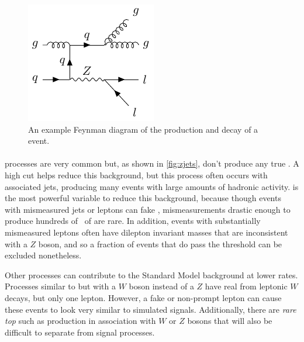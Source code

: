 \begin{centering}
\begin{figure}[bth]
\myfloatalign
\includegraphics[width=.70\linewidth]{feynman/zjets.pdf}
\caption{An example Feynman diagram of the production and decay of a \dyjets event.}
\label{fig:zjets}
\end{figure}
\end{centering}

\paragraph{\dyjets} processes are very common but, as shown in \autoref{fig:zjets}, don't produce any true \MET. A high \HT cut helps reduce this background, but this process often occurs with associated jets, producing many events with large amounts of hadronic activity. \MET is the most powerful variable to reduce this background, because though events with mismeasured jets or leptons can fake \MET, mismeasurements drastic enough to produce hundreds of \gev~of \met are rare. In addition, events with substantially mismeasured leptons often have dilepton invariant masses that are inconsistent with a $Z$ boson, and so a fraction of \dyjets events that do pass the \MET threshold can be excluded nonetheless.  

Other processes can contribute to the Standard Model background at lower rates. Processes similar to \dyjets but with a $W$ boson instead of a $Z$ have real \MET from leptonic $W$ decays, but only one lepton. However, a fake or non-prompt lepton can cause these events to look very similar to simulated signals. Additionally, there are \textit{rare top} such as \ttbar production in association with $W$ or $Z$ bosons that will also be difficult to separate from signal processes.

